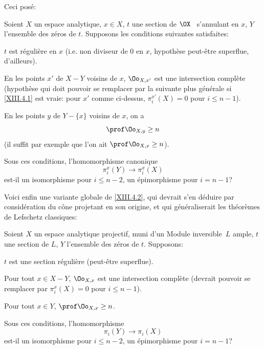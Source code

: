 Ceci pos\'e:

\begin{probleme} \label{XIII.4.2}
Soient $X$ un espace analytique, $x\in X$, $t$ une section de $\OX$ \ s'annulant en $x$, $Y$ l'ensemble des z\'eros de $t$. Supposons les conditions suivantes satisfaites:
\begin{enumeratea}
\item
$t$ est r\'eguli\`ere en $x$ (i.e. non diviseur de $0$ en $x$, hypoth\`ese peut-\^etre superflue, d'ailleurs).
\item
En les points $x'$ de $X-Y$ voisins de $x$, $\Oo_{X, x'}$ est une intersection compl\`ete (hypoth\`ese qui doit pouvoir se remplacer par la suivante plus g\'en\'erale si \ref{XIII.4.1} est vraie: pour $x'$ comme ci-dessus, $\pi_i^{x'}(X)=0$ pour $i\le n-1$).
\item
En les points $y$ de $Y-\{ x\}$ voisins de $x$, on a
$$
\prof \Oo_{X, y}\ge n$$
(il suffit par exemple que l'on ait $\prof\Oo_{X, x}\ge n$).
\end{enumeratea}

Sous ces conditions, l'homomorphisme canonique
$$
\pi_i^x(Y)\to \pi_i^x(X)$$
est-il un isomorphisme pour $i\le n-2$, un \'epimorphisme pour $i=n-1$?
\end{probleme}

Voici enfin une variante globale de \ref{XIII.4.2}, qui devrait s'en d\'eduire par consid\'eration du c\^{o}ne projetant en son origine, et qui g\'en\'eraliserait les th\'eor\`emes de Lefschetz classiques:

\begin{probleme} \label{XIII.4.3}
Soient $X$ un espace analytique projectif, muni d'un Module inversible~$L$ ample, $t$ une section de $L$, $Y$ l'ensemble des z\'eros de $t$. Supposons:
\begin{enumeratea}
\item
$t$ est une section r\'eguli\`ere (\ignorespaces peut-\^etre superflue).
\item
Pour tout $x\in X-Y$, $\Oo_{X, x}$ est une intersection compl\`ete (devrait pouvoir se remplacer par $\pi_i^{x}(X)=0$ pour $i\le n-1$).
\item
Pour tout $x\in Y$, $\prof \Oo_{X, x}\ge n$.
\end{enumeratea}

Sous ces conditions, l'homomorphisme
$$
\pi_i(Y)\to \pi_i(X)$$
est-il un isomorphisme pour $i\le n-2$, un \'epimorphisme pour $i=n-1$?
\end{probleme}

